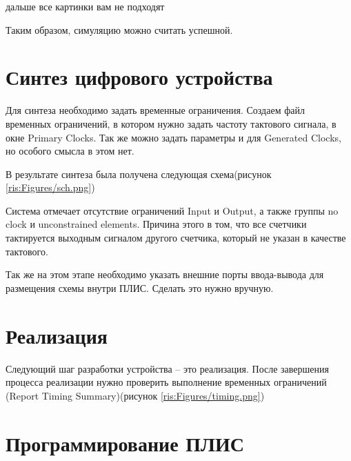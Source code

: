 \begin{sloppypar}
дальше все картинки вам не подходят
\newpage

Таким образом, симуляцию можно считать успешной.
\section{Синтез цифрового устройства} %
Для синтеза необходимо задать временные ограничения. Создаем файл временных ограничений, в котором нужно задать частоту тактового сигнала, в окне Primary Clocks. Так же можно задать параметры и для Generated Clocks, но особого смысла в этом нет.

В результате синтеза была получена следующая схема(рисунок \ref{ris:Figures/sch.png})
\begin{landscape}
\end{landscape}

\newpage
Система отмечает отсутствие ограничений Input и Output, а также группы no clock и unconstrained elements. Причина этого в том, что все счетчики тактируется выходным сигналом другого счетчика, который не указан в качестве тактового.

Так же на этом этапе необходимо указать внешние порты ввода-вывода для размещения схемы внутри ПЛИС. Сделать это нужно вручную.



\section{Реализация} %
Следующий шаг разработки устройства – это реализация.
После завершения процесса реализации нужно проверить выполнение временных ограничений (Report Timing Summary)(рисунок \ref{ris:Figures/timing.png})
\section{Программирование ПЛИС} %


\end{sloppypar}
